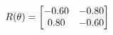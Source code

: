 \documentclass[preview]{standalone}
\begin{document}
\begin{align*}
\special{dvisvgm:raw <g id='unique000'>}R(\theta) = \begin{bmatrix}-0.60 & -0.80\\0.80 & -0.60\end{bmatrix}\special{dvisvgm:raw </g>}
\end{align*}
\end{document}
